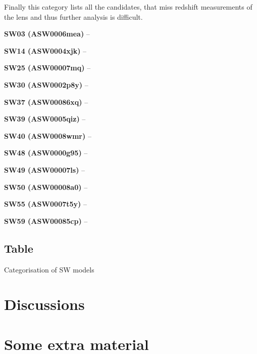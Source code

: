 \documentclass[fleqn,usenatbib]{mnras}
\newcommand{\lenstitle}[1]{\noindent\textbf{#1} --}
\begin{document}
Finally this category lists all the candidates, that miss redshift measurements of the lens and thus further analysis is difficult.

\lenstitle{SW03 (ASW0006mea)}

\lenstitle{SW14 (ASW0004xjk)}

\lenstitle{SW25 (ASW00007mq)}

\lenstitle{SW30 (ASW0002p8y)}

\lenstitle{SW37 (ASW00086xq)}

\lenstitle{SW39 (ASW0005qiz)}

\lenstitle{SW40 (ASW0008wmr)}

\lenstitle{SW48 (ASW0000g95)}

\lenstitle{SW49 (ASW00007ls)}

\lenstitle{SW50 (ASW00008a0)}

\lenstitle{SW55 (ASW0007t5y)}

\lenstitle{SW59 (ASW00085cp)}


\subsection{Table}

\begin{table}
  \caption{Categorisation of SW models}
  \label{tab:models}

\end{table}



\section{Discussions}










\appendix

\section{Some extra material}
\end{document}
